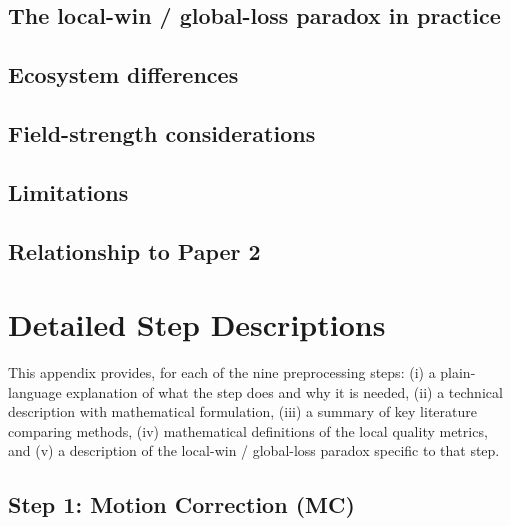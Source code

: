 \documentclass[11pt,a4paper]{article}
\begin{document}
\subsection{The local-win / global-loss paradox in practice}

\subsection{Ecosystem differences}

\subsection{Field-strength considerations}

\subsection{Limitations}

\subsection{Relationship to Paper 2}

\newpage




\appendix
\section{Detailed Step Descriptions}
\label{app:steps}

This appendix provides, for each of the nine preprocessing steps: (i) a plain-language explanation of what the step does and why it is needed, (ii) a technical description with mathematical formulation, (iii) a summary of key literature comparing methods, (iv) mathematical definitions of the local quality metrics, and (v) a description of the local-win / global-loss paradox specific to that step.

\subsection{Step 1: Motion Correction (MC)}
\label{app:mc}
\end{document}
